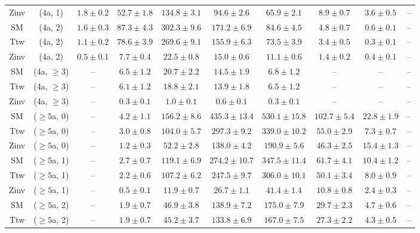 \begin{table}[h!]
{\begin{tabular}{cccccccccc}
	Zinv & (4a, 1) & $1.8\pm 0.2$ & $52.7\pm 1.8$ & $134.8\pm 3.1$ & $94.6\pm 2.6$ & $65.9\pm 2.1$ & $8.9\pm 0.7$ & $3.6\pm 0.5$ & -- \\[0.5ex] 
	SM & (4a, 2) & $1.6\pm 0.3$ & $87.3\pm 4.3$ & $302.3\pm 9.6$ & $171.2\pm 6.9$ & $84.6\pm 4.5$ & $4.8\pm 0.7$ & $0.6\pm 0.1$ & -- \\[0.5ex] 
	Ttw & (4a, 2) & $1.1\pm 0.2$ & $78.6\pm 3.9$ & $269.6\pm 9.1$ & $155.9\pm 6.3$ & $73.5\pm 3.9$ & $3.4\pm 0.5$ & $0.3\pm 0.1$ & -- \\[0.5ex] 
	Zinv & (4a, 2) & $0.5\pm 0.1$ & $7.7\pm 0.4$ & $22.5\pm 0.8$ & $15.0\pm 0.6$ & $11.1\pm 0.6$ & $1.4\pm 0.2$ & $0.4\pm 0.1$ & -- \\[0.5ex] 
	SM & (4a, $\ge3$) & -- & $6.5\pm 1.2$ & $20.7\pm 2.2$ & $14.5\pm 1.9$ & $6.8\pm 1.2$ & -- & -- & -- \\[0.5ex] 
	Ttw & (4a, $\ge3$) & -- & $6.1\pm 1.2$ & $18.8\pm 2.1$ & $13.9\pm 1.8$ & $6.5\pm 1.2$ & -- & -- & -- \\[0.5ex] 
	Zinv & (4a, $\ge3$) & -- & $0.3\pm 0.1$ & $1.0\pm 0.1$ & $0.6\pm 0.1$ & $0.3\pm 0.1$ & -- & -- & -- \\[0.5ex] 
	SM & ($\ge5$a, 0) & -- & $4.2\pm 1.1$ & $156.2\pm 8.6$ & $435.3\pm 13.4$ & $530.1\pm 15.8$ & $102.7\pm 5.4$ & $22.8\pm 1.9$ & -- \\[0.5ex] 
	Ttw & ($\ge5$a, 0) & -- & $3.0\pm 0.8$ & $104.0\pm 5.7$ & $297.3\pm 9.2$ & $339.0\pm 10.2$ & $55.0\pm 2.9$ & $7.3\pm 0.7$ & -- \\[0.5ex] 
	Zinv & ($\ge5$a, 0) & -- & $1.2\pm 0.3$ & $52.2\pm 2.8$ & $138.0\pm 4.2$ & $190.9\pm 5.6$ & $46.3\pm 2.5$ & $15.4\pm 1.3$ & -- \\[0.5ex] 
	SM & ($\ge5$a, 1) & -- & $2.7\pm 0.7$ & $119.1\pm 6.9$ & $274.2\pm 10.7$ & $347.5\pm 11.4$ & $61.7\pm 4.1$ & $10.4\pm 1.2$ & -- \\[0.5ex] 
	Ttw & ($\ge5$a, 1) & -- & $2.2\pm 0.6$ & $107.2\pm 6.2$ & $247.5\pm 9.7$ & $306.0\pm 10.1$ & $50.1\pm 3.4$ & $8.0\pm 0.9$ & -- \\[0.5ex] 
	Zinv & ($\ge5$a, 1) & -- & $0.5\pm 0.1$ & $11.9\pm 0.7$ & $26.7\pm 1.1$ & $41.4\pm 1.4$ & $10.8\pm 0.8$ & $2.4\pm 0.3$ & -- \\[0.5ex] 
	SM & ($\ge5$a, 2) & -- & $1.9\pm 0.7$ & $46.9\pm 3.8$ & $138.9\pm 7.2$ & $175.0\pm 7.9$ & $29.7\pm 2.3$ & $4.7\pm 0.6$ & -- \\[0.5ex] 
	Ttw & ($\ge5$a, 2) & -- & $1.9\pm 0.7$ & $45.2\pm 3.7$ & $133.8\pm 6.9$ & $167.0\pm 7.5$ & $27.3\pm 2.2$ & $4.3\pm 0.5$ & -- \\[0.5ex] 

\end{tabular}}
\end{table}
